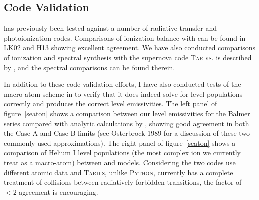\documentclass[useAMS,usenatbib,onecolumn]{mn2e2}
\begin{document}
\subsection{Code Validation}

\py has previously been tested against a number of radiative transfer and
photoionization codes. Comparisons of ionization balance with \cld \citep{cloudy2013} 
can be found in LK02 and H13 showing excellent agreement. We have also conducted comparisons
of ionization and spectral synthesis with the supernova code \textsc{Tardis.} \tar is described by
\citep{kerzendorfsim}, and the spectral comparisons can be found therein.



In addition to these code validation efforts, I have also conducted tests of
the macro atom scheme in \py to verify that it does indeed solve for level populations correctly
and produces the correct level emissivities. The left panel of figure~\ref{seaton} shows a comparison
between our level emissivities for the Balmer series compared with analytic calculations
by \cite{seaton1959}, showing good agreement in both the Case A and Case B limits 
(see Osterbrock 1989 for a discussion of these two commonly used approximations\nocite{osterbrock}).
The right panel of figure~\ref{seaton} shows a comparison of Helium I level populations (the most
complex ion we currently treat as a macro-atom) between \py and \tar models. Considering the 
two codes use different atomic data and \textsc{Tardis,} unlike \textsc{Python,} currently has a complete treatment of
collisions between radiatively forbidden transitions, the factor of $<2$ agreement is 
encouraging. 
\end{document}
